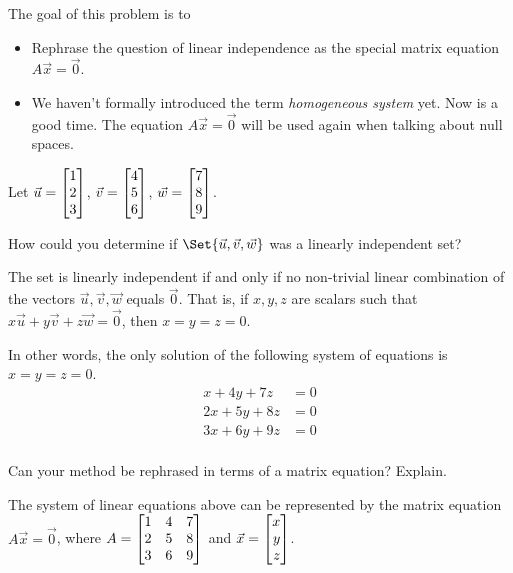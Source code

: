 \documentclass{workbook}
\newcommand{\bookonlynewpage}{\begin{bookonly}\newpage\end{bookonly}}
\begin{document}
\begin{slide}

	\bookonlynewpage
	\question
	\begin{annotation}
		\begin{goals}

			The goal of this problem is to
			\begin{itemize}
				\item Rephrase the question of linear independence as the special
					matrix equation $A\vec x=\vec 0$.
			\end{itemize}
		\end{goals}

		\begin{notes}
			\begin{itemize}
				\item We haven't formally introduced the term \emph{homogeneous system}
					yet. Now is a good time. The equation $A\vec x=\vec 0$ will be used
					again when talking about null spaces.
			\end{itemize}
		\end{notes}
	\end{annotation}
	Let $\vec u=\mat{1\\2\\3}$, $\vec v=\mat{4\\5\\6}$, $\vec w=\mat{7\\8\\9}$.
	\begin{parts}
		\item How could you determine if $\Set{\vec u,\vec v,\vec w}$ was a linearly
			independent set?
			\begin{solution}
				The set is linearly independent if and only if no non-trivial linear
				combination of the vectors $\vec u,\vec v,\vec w$ equals $\vec 0$.
				That is, if $x, y, z$ are scalars such that
				$x\vec u+y\vec v+z\vec w=\vec 0$, then $x=y=z=0$.

				In other words, the only solution of the following
				system of equations is $x=y=z=0$.
				\begin{align*}
					x + 4y + 7z &= 0 \\
					2x + 5y + 8z &= 0 \\
					3x + 6y + 9z &= 0 \\
				\end{align*}
			\end{solution}
		\item Can your method be rephrased in terms of a matrix equation? Explain.
			\begin{solution}
				The system of linear equations above can be represented by the
				matrix equation $A\vec x = \vec 0$, where $A = \mat{1&4&7\\2&5&8\\3&6&9}$
				and $\vec x=\mat{x\\y\\z}$.


\end{solution}
\end{parts}
\end{slide}
\end{document}
